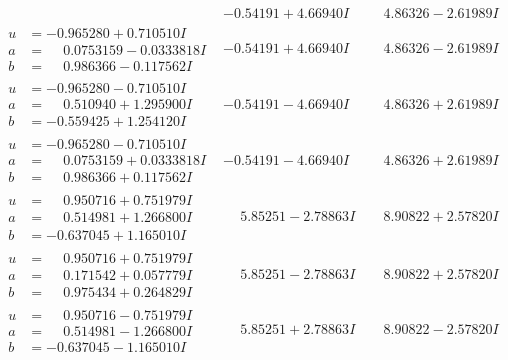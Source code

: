 \documentclass[1p]{elsarticle_modified}
\theoremstyle{definition}
\begin{document}
$$\begin{array}{c|c|c}
 & -0.54191 + 4.66940 I & \phantom{-}4.86326 - 2.61989 I \\ \hline\begin{aligned}
u &= -0.965280 + 0.710510 I \\
a &= \phantom{-}0.0753159 - 0.0333818 I \\
b &= \phantom{-}0.986366 - 0.117562 I\end{aligned}
 & -0.54191 + 4.66940 I & \phantom{-}4.86326 - 2.61989 I \\ \hline\begin{aligned}
u &= -0.965280 - 0.710510 I \\
a &= \phantom{-}0.510940 + 1.295900 I \\
b &= -0.559425 + 1.254120 I\end{aligned}
 & -0.54191 - 4.66940 I & \phantom{-}4.86326 + 2.61989 I \\ \hline\begin{aligned}
u &= -0.965280 - 0.710510 I \\
a &= \phantom{-}0.0753159 + 0.0333818 I \\
b &= \phantom{-}0.986366 + 0.117562 I\end{aligned}
 & -0.54191 - 4.66940 I & \phantom{-}4.86326 + 2.61989 I \\ \hline\begin{aligned}
u &= \phantom{-}0.950716 + 0.751979 I \\
a &= \phantom{-}0.514981 + 1.266800 I \\
b &= -0.637045 + 1.165010 I\end{aligned}
 & \phantom{-}5.85251 - 2.78863 I & \phantom{-}8.90822 + 2.57820 I \\ \hline\begin{aligned}
u &= \phantom{-}0.950716 + 0.751979 I \\
a &= \phantom{-}0.171542 + 0.057779 I \\
b &= \phantom{-}0.975434 + 0.264829 I\end{aligned}
 & \phantom{-}5.85251 - 2.78863 I & \phantom{-}8.90822 + 2.57820 I \\ \hline\begin{aligned}
u &= \phantom{-}0.950716 - 0.751979 I \\
a &= \phantom{-}0.514981 - 1.266800 I \\
b &= -0.637045 - 1.165010 I\end{aligned}
 & \phantom{-}5.85251 + 2.78863 I & \phantom{-}8.90822 - 2.57820 I \\ \hline\begin{aligned}

\end{aligned}
\end{array}$$
\end{document}
